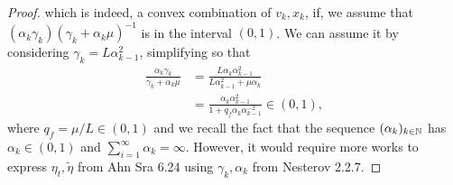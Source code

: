 \documentclass[12pt]{article}
\begin{document}
\begin{proof}
                which is indeed, a convex combination of $v_k, x_k$, if, we assume that $(\alpha_k\gamma_k)(\gamma_k + \alpha_k \mu)^{-1}$ is in the interval $(0, 1)$. 
                We can assume it by considering $\gamma_k = L\alpha_{k-1}^2$, simplifying so that 
                \begin{align*}
                    \frac{\alpha_k \gamma_k}{\gamma_k + \alpha_k \mu}
                    &= 
                    \frac{L\alpha_k \alpha_{k - 1}^2}{L\alpha_{k - 1}^2 + \mu \alpha_k}
                    \\
                    &= \frac{\alpha_k \alpha_{k - 1}^2}{1 + q_f \alpha_k \alpha_{k - 1}^{-2}} \in (0, 1), 
                \end{align*}
                where $q_f = \mu / L \in (0, 1)$ and we recall the fact that the sequence $(\alpha_k)_{k \in \mathbb N}$ has $\alpha_k \in (0, 1)$ and $\sum_{i = 1}^{\infty} \alpha_k = \infty$. 
                However, it would require more works to express $\eta_t, \tilde\eta$ from Ahn Sra 6.24 using $\gamma_k, \alpha_k$ from Nesterov 2.2.7. 
            \end{proof}
\end{document}
